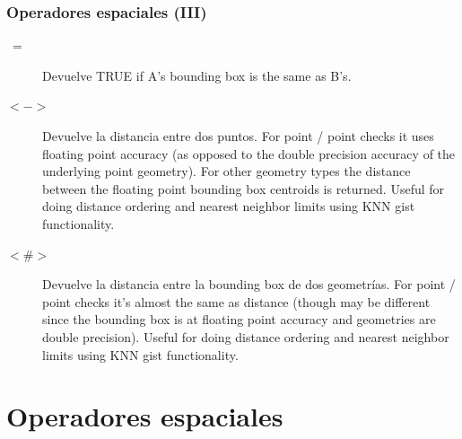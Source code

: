 \documentclass{classes/beamer_GeomaticaUA}
\begin{document}
\begin{frame}[fragile]
\frametitle{Operadores espaciales (III)}
\begin{description}
\item[$~=$]Devuelve TRUE if A's bounding box is the same as B's.
\item[$<->$]Devuelve la distancia entre dos puntos. For point / point checks it uses floating point accuracy (as opposed to the double precision accuracy of the underlying point geometry). For other geometry types the distance between the floating point bounding box centroids is returned. Useful for doing distance ordering and nearest neighbor limits using KNN gist functionality.
\item[$<\#>$]Devuelve la distancia entre la bounding box de dos geometrías. For point / point checks it's almost the same as distance (though may be different since the bounding box is at floating point accuracy and geometries are double precision). Useful for doing distance ordering and nearest neighbor limits using KNN gist functionality.
\end{description}
\end{frame}
\section[Ejercicios]{Operadores espaciales}

\end{document}
